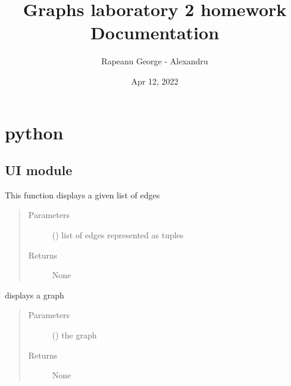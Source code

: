 \documentclass[letterpaper,10pt,english]{sphinxmanual}
\title{Graphs laboratory 2 homework Documentation}
\date{Apr 12, 2022}
\author{Rapeanu George - Alexandru}
\begin{document}
\pagestyle{empty}
\sphinxmaketitle
\pagestyle{plain}
\sphinxtableofcontents
\pagestyle{normal}
\label{\detokenize{index::doc}}



\chapter{python}
\label{\detokenize{modules:python}}\label{\detokenize{modules::doc}}

\section{UI module}
\label{\detokenize{UI:module-UI}}\label{\detokenize{UI:ui-module}}\label{\detokenize{UI::doc}}

\begin{fulllineitems}
\label{\detokenize{UI:UI.display_edges}}
This function displays a given list of edges
\begin{quote}\begin{description}
\item[{Parameters}] \leavevmode
{} () \textendash{} list of edges represented as tuples

\item[{Returns}] \leavevmode
None

\end{description}\end{quote}

\end{fulllineitems}


\begin{fulllineitems}
\label{\detokenize{UI:UI.display_graph}}
displays a graph
\begin{quote}\begin{description}
\item[{Parameters}] \leavevmode
{} ({\hyperref[\detokenize{UndirectedGraph:UndirectedGraph.UndirectedGraph}]{}}) \textendash{} the graph

\item[{Returns}] \leavevmode
None

\end{description}\end{quote}

\end{fulllineitems}
\end{document}
